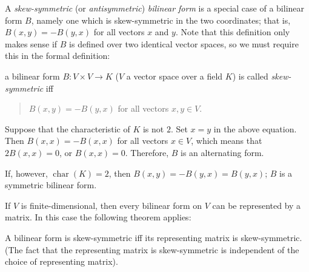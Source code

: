 \documentclass[12pt]{article}
\begin{document}
A {\em skew-symmetric} (or {\em antisymmetric}) {\em bilinear form} is a special case of a bilinear form $B$, namely one which is skew-symmetric in the two coordinates; that is, $B(x,y) = -B(y,x)$ for all vectors $x$ and $y$. Note that this definition only makes sense if $B$ is defined over two identical vector spaces, so we must require this in the formal definition:

a bilinear form $B: V \times V \rightarrow K$ ($V$ a vector
space over a field $K$) is called {\em skew-symmetric} iff
\begin{quote}
$B(x,y) = -B(y,x)$ for all vectors $x, y \in V$.
\end{quote}

Suppose that the characteristic of $K$ is not $2$.  Set $x=y$ in the above equation.  Then $B(x,x)=-B(x,x)$ for all vectors $x \in V$, which means that $2B(x,x)=0$, or $B(x,x)=0$.  Therefore, $B$ is an alternating form.

If, however, $\operatorname{char}(K)=2$, then $B(x,y)=-B(y,x)=B(y,x)$; $B$ is a symmetric bilinear form.

If $V$ is finite-dimensional, then every bilinear form on $V$ can be represented
by a matrix. In this case the following theorem applies:

A bilinear form is skew-symmetric iff its representing matrix is skew-symmetric.
(The fact that the representing matrix is skew-symmetric is independent of the
choice of representing matrix).
\end{document}

